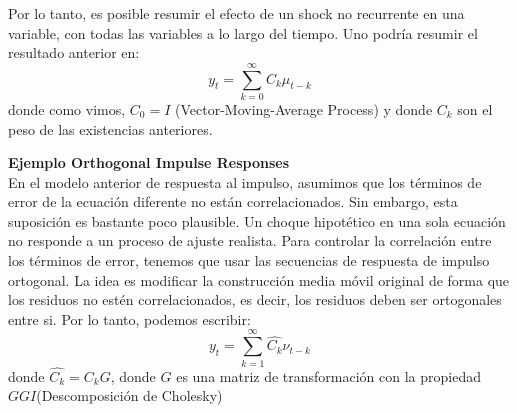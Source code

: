 Por lo tanto, es posible resumir el efecto de un shock no recurrente en una variable, con todas las variables a lo largo del tiempo. Uno podr\'{i}a resumir el resultado anterior en:
\begin{equation}
y_t = \sum_{k=0}^{\infty}  C_k \mu_{t-k}
\end{equation}
donde como vimos, $C_{0}=I$ (Vector-Moving-Average Process) y donde $C_{k}$ son el peso de las existencias anteriores. 	

	
	\textbf{Ejemplo Orthogonal Impulse Responses}\\
	
	En el modelo anterior de respuesta al impulso, asumimos que los t\'erminos de error de la ecuaci\'on diferente no est\'an correlacionados. Sin embargo, esta suposici\'on es bastante poco plausible. Un choque hipot\'etico en una sola ecuaci\'on no responde a un proceso de ajuste realista. Para controlar la correlaci\'on entre los t\'erminos de error, tenemos que usar las secuencias de respuesta de impulso ortogonal. La idea es modificar la construcci\'on media m\'ovil original de forma que los residuos no est\'en correlacionados, es decir, los residuos deben ser ortogonales entre si. Por lo tanto, podemos escribir:
	\begin{equation}
	y_{t}=\sum_{k=1}^{\infty} \hat{C_{k}}\nu_{t-k}
	\end{equation}
donde $\hat{C_{k}}=C_{k} G$, donde $G$ es una matriz de transformación con la propiedad $GGI$(Descomposición de Cholesky)
	
